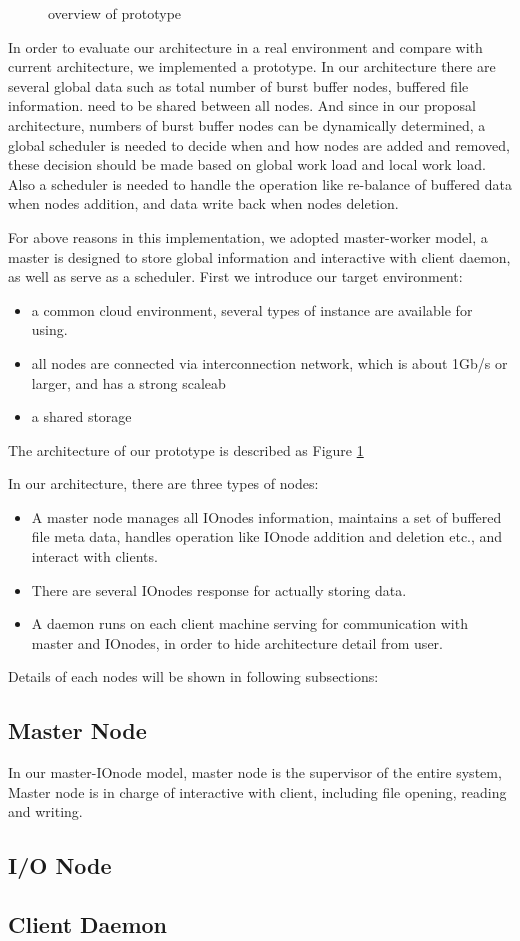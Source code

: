 \begin{figure}
\caption{overview of prototype}
\label{overview of prototype}
\end{figure}

In order to evaluate our architecture in a real environment and compare with current architecture, we implemented a prototype. 
In our architecture there are several global data such as total number of burst buffer nodes,
buffered file information. need to be shared between all nodes.
And since in our proposal architecture, numbers of burst buffer nodes can be dynamically determined,
a global scheduler is needed to decide when and how nodes are added and removed, these decision should be made based on global work load and local work load.
Also a scheduler is needed to handle the operation like re-balance of buffered data when nodes addition, and data write back when nodes deletion.

For above reasons in this implementation, we adopted master-worker model, a master is designed to store global information and interactive with client daemon, as well as serve as a scheduler.
First we introduce our target environment:
\begin{itemize}
  \item a common cloud environment, several types of instance are available for using.
  \item all nodes are connected via interconnection network, which is about 1Gb/s or larger, and has a strong scaleab
  \item a shared storage 
\end{itemize}
The architecture of our prototype is described as Figure \ref{overview of prototype}

In our architecture, there are three types of nodes:
\begin{itemize}
	\item A master node manages all IOnodes information, maintains a set of buffered file meta data, handles operation like IOnode addition and deletion etc., and interact with clients.
	\item There are several IOnodes response for actually storing data.
	\item A daemon runs on each client machine serving for communication with
	master and IOnodes, in order to hide architecture detail from user.
\end{itemize}

Details of each nodes will be shown in following subsections:

\subsection{Master Node}
In our master-IOnode model, master node is the supervisor of the entire system,
Master node is in charge of interactive with client, including file opening, reading and writing.
 
\subsection{I/O Node}

\subsection{Client Daemon}